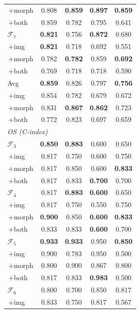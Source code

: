 \documentclass[pdflatex,sn-nature]{sn-jnl}
\begin{document}
\begin{table}[p]
\begin{tabular}{@{}l cccc@{}}
\;\,$+$morph         & 0.808 & \textbf{0.859} & \textbf{0.897} & \textbf{0.859} \\
\;\,$+$both          & 0.859 & 0.782 & 0.795 & 0.641 \\
\addlinespace[2pt]
$\mathcal{F}_7$      & \textbf{0.821} & 0.756 & \textbf{0.872} & 0.680 \\
\;\,$+$img           & \textbf{0.821} & 0.718 & 0.692 & 0.551 \\
\;\,$+$morph         & 0.782 & \textbf{0.782} & 0.859 & \textbf{0.692} \\
\;\,$+$both          & 0.769 & 0.718 & 0.718 & 0.590 \\
\addlinespace[2pt]
Avg & \textbf{0.859} & 0.826 & 0.797 & \textbf{0.756} \\
\;\,$+$img & 0.854 & 0.782 & 0.679 & 0.672 \\
\;\,$+$morph & 0.831 & \textbf{0.867} & \textbf{0.862} & 0.723 \\
\;\,$+$both & 0.772 & 0.823 & 0.697 & 0.659 \\
\midrule
\multicolumn{5}{l}{\textit{OS (C-index)}} \\
$\mathcal{F}_3$      & \textbf{0.850} & \textbf{0.883} & 0.600 & 0.650 \\
\;\,$+$img           & 0.817 & 0.750 & 0.600 & 0.750 \\
\;\,$+$morph         & 0.817 & 0.850 & 0.600 & \textbf{0.833} \\
\;\,$+$both          & 0.817 & 0.833 & \textbf{0.700} & 0.700 \\
\addlinespace[2pt]
$\mathcal{F}_4$      & 0.817 & \textbf{0.883} & \textbf{0.600} & 0.650 \\
\;\,$+$img           & 0.817 & 0.750 & 0.550 & 0.750 \\
\;\,$+$morph         & \textbf{0.900} & 0.850 & \textbf{0.600} & \textbf{0.833} \\
\;\,$+$both          & 0.833 & 0.833 & \textbf{0.600} & 0.700 \\
\addlinespace[2pt]
$\mathcal{F}_5$      & \textbf{0.933} & \textbf{0.933} & 0.950 & \textbf{0.850} \\
\;\,$+$img           & 0.900 & 0.783 & 0.950 & 0.500 \\
\;\,$+$morph         & 0.800 & 0.900 & 0.867 & 0.800 \\
\;\,$+$both          & 0.817 & 0.833 & \textbf{0.983} & 0.500 \\
\addlinespace[2pt]
$\mathcal{F}_6$      & 0.800 & 0.700 & 0.850 & 0.817 \\
\;\,$+$img           & 0.833 & 0.750 & 0.817 & 0.567 \\

\end{tabular}
\end{table}
\end{document}
